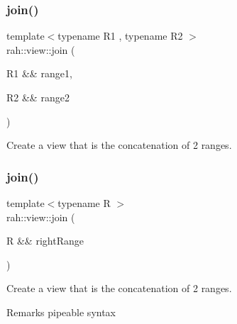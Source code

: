 \subsubsection{\texorpdfstring{join()}{join()}\hspace{0.1cm}{\footnotesize\ttfamily [1/2]}}
{\footnotesize\ttfamily template$<$typename R1 , typename R2 $>$ \\
rah\+::view\+::join (\begin{DoxyParamCaption}\item[{R1 \&\&}]{range1,  }\item[{R2 \&\&}]{range2 }\end{DoxyParamCaption})}



Create a view that is the concatenation of 2 ranges. 


\begin{DoxyCodeInclude}{0}
\end{DoxyCodeInclude}
\mbox{\label{namespacerah_1_1view_a9311214c2d98f420e73b679e02bd7f7f}} 
\subsubsection{\texorpdfstring{join()}{join()}\hspace{0.1cm}{\footnotesize\ttfamily [2/2]}}
{\footnotesize\ttfamily template$<$typename R $>$ \\
rah\+::view\+::join (\begin{DoxyParamCaption}\item[{R \&\&}]{right\+Range }\end{DoxyParamCaption})}



Create a view that is the concatenation of 2 ranges. 

\begin{DoxyRemark}{Remarks}
pipeable syntax
\end{DoxyRemark}

